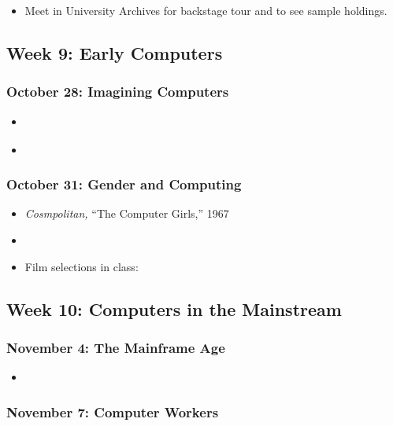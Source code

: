 \begin{itemize}
\item
  Meet in University Archives for backstage tour and to see sample
  holdings.
\end{itemize}

\subsection{Week 9: Early Computers}

\subsubsection{October 28: Imagining Computers}

\begin{itemize}
\item
  \cite{bush_as_1945}
\item
  \cite{bush_memex_1991}
\end{itemize}

\subsubsection{October 31: Gender and Computing}

\begin{itemize}
\item
  \emph{Cosmpolitan,} ``The Computer Girls,'' 1967
\item
  \cite{light_when_1999}
\item
  Film selections in class: \cite{lang_desk_1957}
\end{itemize}

\subsection{Week 10: Computers in the Mainstream}

\subsubsection{November 4: The Mainframe Age}

\begin{itemize}
\item
  \cite[34-69,254-274]{miller_assault_1971}
\end{itemize}

\subsubsection{November 7: Computer Workers}

